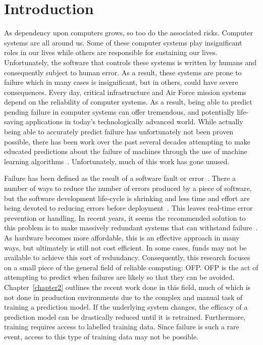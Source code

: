 \section{Introduction} \label{chapter1}
As dependency upon computers grows, so too do the associated risks.  Computer
systems are all around us.  Some of these computer systems play insignificant
roles in our lives while others are responsible for sustaining our lives.
Unfortunately, the software that controls these systems is written by humans
and consequently subject to human error.  As a result, these systems are prone
to failure which in many cases is insignificant, but in others, could have
severe consequences.  Every day, critical infrastructure and Air Force mission
systems depend on the reliability of computer systems.  As a result, being able
to predict pending failure in computer systems can offer tremendous, and
potentially life-saving applications in today's technologically advanced world.
While actually being able to accurately predict failure has unfortunately not
been proven possible, there has been work over the past several decades
attempting to make educated predictions about the failure of machines through
the use of machine learning algorithms~\cite{salfnerSurvey}.  Unfortunately,
much of this work has gone unused.  

Failure has been defined as the result of a software fault or
error~\cite{salfnerSurvey}.  There a number of ways to reduce the number of
errors produced by a piece of software, but the software development life-cycle
is shrinking and less time and effort are being devoted to reducing errors
before deployment~\cite{schmidt2016}.  This leaves real-time error prevention
or handling.  In recent years, it seems the recommended solution to this
problem is to make massively redundant systems that can withstand
failure~\cite{bauer2012}.  As hardware becomes more affordable, this is an
effective approach in many ways, but ultimately is still not cost efficient.
In some cases, funds may not be available to achieve this sort of redundancy.
Consequently, this research focuses on a small piece of the general field of
reliable computing: \ac{OFP}.  \ac{OFP} is the act of attempting to predict
when failures are likely so that they can be avoided.  Chapter~\ref{chapter2}
outlines the recent work done in this field, much of which is not done in
production environments due to the complex and manual task of training a
prediction model.  If the underlying system changes, the efficacy of a
prediction model can be drastically reduced until it is retrained.
Furthermore, training requires access to labelled training data.  Since failure
is such a rare event, access to this type of training data may not be possible.  

